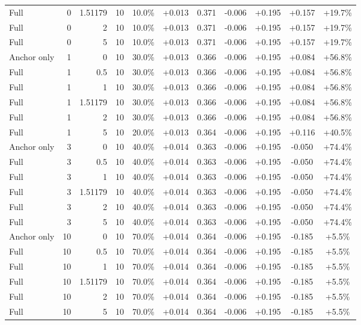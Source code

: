 \begin{table}[htbp]
\begin{tabular}{lrrrccccccc}
Full & 0 & 1.51179 & 10 & 10.0\% & +0.013 & 0.371 & -0.006 & +0.195 & +0.157 & +19.7\% \\
Full & 0 & 2 & 10 & 10.0\% & +0.013 & 0.371 & -0.006 & +0.195 & +0.157 & +19.7\% \\
Full & 0 & 5 & 10 & 10.0\% & +0.013 & 0.371 & -0.006 & +0.195 & +0.157 & +19.7\% \\
Anchor only & 1 & 0 & 10 & 30.0\% & +0.013 & 0.366 & -0.006 & +0.195 & +0.084 & +56.8\% \\
Full & 1 & 0.5 & 10 & 30.0\% & +0.013 & 0.366 & -0.006 & +0.195 & +0.084 & +56.8\% \\
Full & 1 & 1 & 10 & 30.0\% & +0.013 & 0.366 & -0.006 & +0.195 & +0.084 & +56.8\% \\
Full & 1 & 1.51179 & 10 & 30.0\% & +0.013 & 0.366 & -0.006 & +0.195 & +0.084 & +56.8\% \\
Full & 1 & 2 & 10 & 30.0\% & +0.013 & 0.366 & -0.006 & +0.195 & +0.084 & +56.8\% \\
Full & 1 & 5 & 10 & 20.0\% & +0.013 & 0.364 & -0.006 & +0.195 & +0.116 & +40.5\% \\
Anchor only & 3 & 0 & 10 & 40.0\% & +0.014 & 0.363 & -0.006 & +0.195 & -0.050 & +74.4\% \\
Full & 3 & 0.5 & 10 & 40.0\% & +0.014 & 0.363 & -0.006 & +0.195 & -0.050 & +74.4\% \\
Full & 3 & 1 & 10 & 40.0\% & +0.014 & 0.363 & -0.006 & +0.195 & -0.050 & +74.4\% \\
Full & 3 & 1.51179 & 10 & 40.0\% & +0.014 & 0.363 & -0.006 & +0.195 & -0.050 & +74.4\% \\
Full & 3 & 2 & 10 & 40.0\% & +0.014 & 0.363 & -0.006 & +0.195 & -0.050 & +74.4\% \\
Full & 3 & 5 & 10 & 40.0\% & +0.014 & 0.363 & -0.006 & +0.195 & -0.050 & +74.4\% \\
Anchor only & 10 & 0 & 10 & 70.0\% & +0.014 & 0.364 & -0.006 & +0.195 & -0.185 & +5.5\% \\
Full & 10 & 0.5 & 10 & 70.0\% & +0.014 & 0.364 & -0.006 & +0.195 & -0.185 & +5.5\% \\
Full & 10 & 1 & 10 & 70.0\% & +0.014 & 0.364 & -0.006 & +0.195 & -0.185 & +5.5\% \\
Full & 10 & 1.51179 & 10 & 70.0\% & +0.014 & 0.364 & -0.006 & +0.195 & -0.185 & +5.5\% \\
Full & 10 & 2 & 10 & 70.0\% & +0.014 & 0.364 & -0.006 & +0.195 & -0.185 & +5.5\% \\
Full & 10 & 5 & 10 & 70.0\% & +0.014 & 0.364 & -0.006 & +0.195 & -0.185 & +5.5\% \\

\end{tabular}
\end{table}

